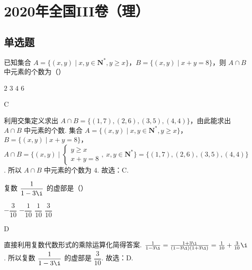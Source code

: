 
\chapter{2020年全国III卷（理）}

\section{单选题}

\begin{problem}
已知集合 \(A=\{(x,y)\mid x,y\in \mathbf N^*,y\ge x\}\)，\(B=\{(x,y)\mid x+y=8\}\)，则 \(A\cap B\) 中元素的个数为（\quad）

\choices
    {\(2\)}
    {\(3\)}
    {\(4\)}
    {\(6\)}
\end{problem}

\begin{answer}
C
\end{answer}

\begin{solution}
利用交集定义求出 \(A\cap B=\{(1,7),(2,6),(3,5),(4,4)\}\)，由此能求出 \(A\cap B\) 中元素的个数.
集合 \(A=\{(x,y)\mid x,y\in \mathbf N^*,y\ge x\}\)，\(B=\{(x,y)\mid x+y=8\}\)，
\(A\cap B=\{(x,y)\mid \begin{cases}
y\ge x\\
x+y=8
\end{cases},\ x,y\in \mathbf N^*\}=\{(1,7),(2,6),(3,5),(4,4)\}\).
所以 \(A\cap B\) 中元素的个数为 \(4\).
故选：C.
\end{solution}

\begin{problem}
复数 \(\dfrac{1}{1-3\i}\) 的虚部是（\quad）

\choices
    {\(-\dfrac{3}{10}\)}
    {\(-\dfrac{1}{10}\)}
    {\(\dfrac{1}{10}\)}
    {\(\dfrac{3}{10}\)}
\end{problem}

\begin{answer}
D
\end{answer}

\begin{solution}
直接利用复数代数形式的乘除运算化简得答案.
\(\frac{1}{1-3\i}=\frac{1+3\i}{(1-3\i)(1+3\i)}=\frac{1}{10}+\frac{3}{10}\i\).
所以复数 \(\dfrac{1}{1-3\i}\) 的虚部是 \(\dfrac{3}{10}\).
故选：D.
\end{solution}

